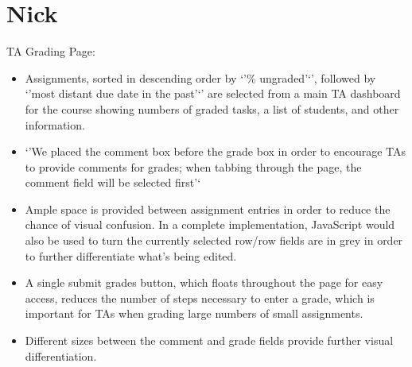 \section{Nick}

TA Grading Page:

\begin{itemize}
\item Assignments, sorted in descending order by `'\% ungraded'`', followed by `'most distant due date in the past'`' are selected from a main TA dashboard for the course showing numbers of graded tasks, a list of students, and other information.

\item `'We placed the comment box before the grade box in order to encourage TAs to provide comments for grades; when tabbing through the page, the comment field will be selected first'`

\item Ample space is provided between assignment entries in order to reduce the chance of visual confusion. In a complete implementation, JavaScript would also be used to turn the currently selected row/row fields are in grey in order to further differentiate what's being edited.

\item A single submit grades button, which floats throughout the page for easy access, reduces the number of steps necessary to enter a grade, which is important for TAs when grading large numbers of small assignments.

\item Different sizes between the comment and grade fields provide further visual differentiation.
\end{itemize}
